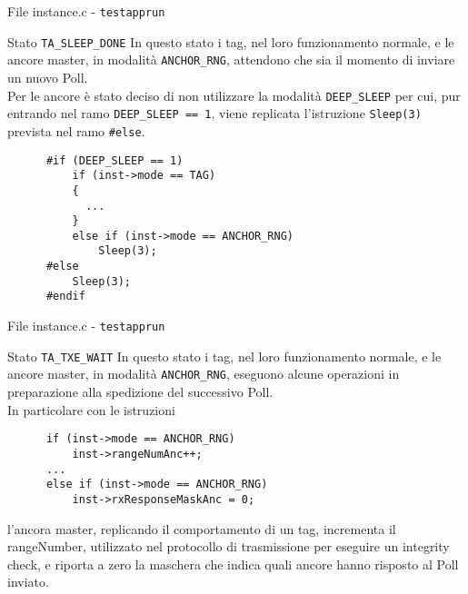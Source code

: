 \begin{frame}[fragile, shrink=10]{File instance.c - \lstinline!testapprun!}
  \begin{block}{Stato \lstinline!TA_SLEEP_DONE!}
    In questo stato i tag, nel loro funzionamento normale, e le ancore master, in modalità
    \lstinline!ANCHOR_RNG!, attendono che sia il momento di inviare un nuovo Poll.\\
    Per le ancore è stato deciso di non utilizzare la modalità \lstinline!DEEP_SLEEP!
    per cui, pur entrando nel ramo \lstinline!DEEP_SLEEP == 1!, viene replicata l'istruzione
    \lstinline!Sleep(3)! prevista nel ramo \lstinline!#else!.
    \begin{lstlisting}
      #if (DEEP_SLEEP == 1)
          if (inst->mode == TAG)
          {
            ...
          }  
          else if (inst->mode == ANCHOR_RNG)
              Sleep(3);
      #else
          Sleep(3);
      #endif
    \end{lstlisting}
  \end{block}
\end{frame}

\begin{frame}[fragile, shrink=10]{File instance.c - \lstinline!testapprun!}
  \begin{block}{Stato \lstinline!TA_TXE_WAIT!}
    In questo stato i tag, nel loro funzionamento normale, e le ancore master, in modalità
    \lstinline!ANCHOR_RNG!, eseguono alcune operazioni in preparazione alla spedizione
    del successivo Poll.\\
    In particolare con le istruzioni
    \begin{lstlisting}
      if (inst->mode == ANCHOR_RNG)
          inst->rangeNumAnc++;
      ...
      else if (inst->mode == ANCHOR_RNG)
          inst->rxResponseMaskAnc = 0;
    \end{lstlisting}
    l'ancora master, replicando il comportamento di un tag, incrementa il rangeNumber,
    utilizzato nel protocollo di trasmissione per eseguire un integrity check, e riporta
    a zero la maschera che indica quali ancore hanno risposto al Poll inviato.
  \end{block}
\end{frame}

